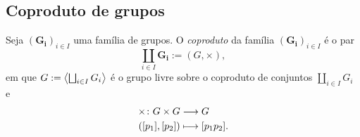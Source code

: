 \subsection{Coproduto de grupos}

\begin{definition}
Seja $(\bm{G_i})_{i \in I}$ uma família de grupos. O \emph{coproduto} da família $(\bm{G_i})_{i \in I}$ é o par
	\begin{equation*}
	\coprod_{i \in I} \bm{G_i} := \left(G,\times \right),
	\end{equation*}
em que $G := \left\langle \bigsqcup_{i \in I} G_i \right\rangle$ é o grupo livre sobre o coproduto de conjuntos $\coprod_{i \in I} G_i$ e
	\begin{align*}
	{\times}\colon {G \times G} &\longrightarrow {G} \\{([p_1],[p_2])} &\longmapsto [p_1p_2].
	\end{align*}
\end{definition}

